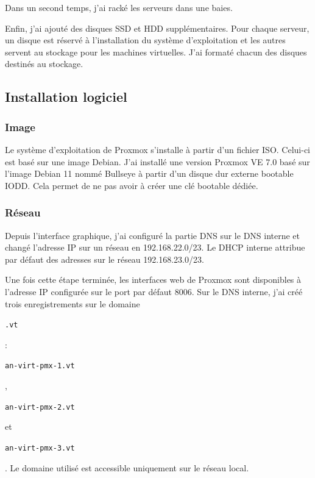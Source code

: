 \documentclass[12pt]{article}
\begin{document}
Dans un second temps, j'ai racké les serveurs dans une baies. 

Enfin, j'ai ajouté des disques \gls{SSD} et \gls{HDD} supplémentaires.
Pour chaque serveur, un disque est réservé à l'installation du système d'exploitation et les autres servent au stockage pour les machines virtuelles.
J'ai formaté chacun des disques destinés au stockage.

\subsection{Installation logiciel}
\subsubsection{Image}
Le système d'exploitation de \gls{Proxmox} s'installe à partir d'un fichier \gls{ISO}. 
Celui-ci est basé sur une image \gls{Debian}. 
J'ai installé une version \gls{Proxmox} VE 7.0 basé sur l'image \gls{Debian} 11 nommé Bullseye à partir d'un disque dur externe bootable IODD. 
Cela permet de ne pas avoir à créer une clé bootable dédiée.

\subsubsection{Réseau}
Depuis l'interface graphique, j'ai configuré la partie \gls{DNS} sur le \gls{DNS} interne et changé l'adresse \gls{IP} sur un réseau en 192.168.22.0/23. 
Le DHCP interne attribue par défaut des adresses sur le réseau 192.168.23.0/23.

Une fois cette étape terminée, les interfaces web de \gls{Proxmox} sont disponibles à l'adresse \gls{IP} configurée sur le port par défaut 8006.
Sur le \gls{DNS} interne, j'ai créé trois enregistrements sur le domaine \begin{code}\texttt{.vt}\end{code}: \begin{code}\texttt{an-virt-pmx-1.vt}\end{code}, \begin{code}\texttt{an-virt-pmx-2.vt}\end{code} et \begin{code}\texttt{an-virt-pmx-3.vt}\end{code}.
Le domaine utilisé est accessible uniquement sur le réseau local.
\end{document}
